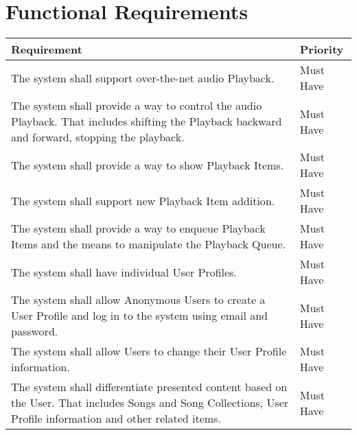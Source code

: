 \clearpage


\section{Functional Requirements}

\begin{table}[h!]
    \centering
    \begin{tabular}{|p{12cm}|p{3cm}|}
        \hline
        \textbf{Requirement}                                                                                                                                                  & \textbf{Priority} \\
        \hline
        The system shall support over-the-net audio Playback.                                                                                                                 & Must Have         \\
        \hline
        The system shall provide a way to control the audio Playback. That includes shifting the Playback backward and forward, stopping the playback. & Must Have \\
        \hline
        The system shall provide a way to show Playback Items.                                                                                                                & Must Have         \\
        \hline
        The system shall support new Playback Item addition.                                                                                                                  & Must Have         \\
        \hline
        The system shall provide a way to enqueue Playback Items and the means to manipulate the Playback Queue. & Must Have \\
        \hline
        The system shall have individual User Profiles.                                                                                                                       & Must Have         \\
        \hline
        The system shall allow Anonymous Users to create a User Profile and log in to the system using email and password. & Must Have \\
        \hline
        The system shall allow Users to change their User Profile information.                                                                                                & Must Have         \\
        \hline
        The system shall differentiate presented content based on the User. That includes Songs and Song Collections, User Profile information and other related items. & Must Have \\

\end{tabular}
\end{table}
